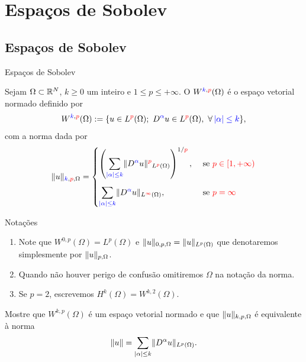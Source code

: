 \section{Espaços de Sobolev}

\subsection*{Espaços de Sobolev}
\begin{frame}{Espaços de Sobolev}
\begin{defin}
 Sejam $\Omega \subset \mathbb{R}^N$, {\color{blue}$k\geq 0$} um inteiro e {\color{red}$1\leq p\leq +\infty$}. O  $W^{{\color{blue}k},{\color{red}p}}(\Omega)$  é o espaço vetorial normado definido por 
 \[W^{{\color{blue}k},{\color{red}p}}(\Omega):=\{u\in L^{\color{red}p}(\Omega);\ D^{\color{blue}\alpha} u\in L^{\color{red}p}(\Omega),\ \forall\, {\color{blue}|\alpha|\leq k}\},\]
 com a norma dada por 
 \[
 \lVert u\rVert_{{\color{blue}k},{\color{red}p},\Omega}=
\begin{cases}
\displaystyle\left(\sum_{{\color{blue}|\alpha|\leq k}} \lVert D^{\color{blue}\alpha} u\rVert^{\color{red}p}_{L^{\color{red}p}(\Omega)}\right)^{1/{\color{red}p}}, & \text{ se } {\color{red}p\in [1,+\infty)}\\[2em]
\displaystyle\sum_{{\color{blue}|\alpha|\leq k}} \lVert D^{\color{blue}\alpha} u\rVert_{L^{\color{red}\infty}(\Omega)}, & \text{ se } {\color{red}p=\infty}
\end{cases}
\]

\end{defin}



\end{frame}

\begin{frame}
	\begin{block}{Notações}
		\begin{enumerate}
			
			\item Note que $W^{0,p}(\Omega)=L^p(\Omega)$ e  $\lVert u\rVert_{0,p,\Omega}=\lVert u\rVert_{L^p(\Omega)}$ que denotaremos simplesmente por $\lVert u\rVert_{p,\Omega}$.
			
			\item Quando não houver perigo de confusão omitiremos $\Omega$ na notação da norma.
			
			
		\item   Se $p=2$, escrevemos $H^k(\Omega)=W^{k,2}(\Omega)$. 
		\end{enumerate}
	\end{block}

	\begin{exer}
	Mostre que $W^{k,p}(\Omega)$ é um espaço vetorial normado e que  $\lVert u\rVert_{k,p,\Omega}$ é equivalente à norma
	\[\lVert u\rVert=\sum_{|\alpha|\leq k}\lVert D^\alpha u\rVert_{L^p(\Omega)}.\]
\end{exer}
\end{frame}

